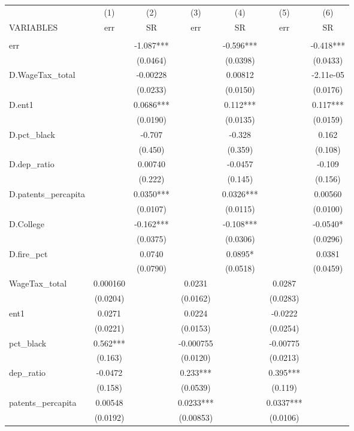 \begin{tabular}{lcccccc} \hline
 & (1) & (2) & (3) & (4) & (5) & (6) \\
VARIABLES & err & SR & err & SR & err & SR \\ \hline
 &  &  &  &  &  &  \\
err &  & -1.087*** &  & -0.596*** &  & -0.418*** \\
 &  & (0.0464) &  & (0.0398) &  & (0.0433) \\
D.WageTax\_total &  & -0.00228 &  & 0.00812 &  & -2.11e-05 \\
 &  & (0.0233) &  & (0.0150) &  & (0.0176) \\
D.ent1 &  & 0.0686*** &  & 0.112*** &  & 0.117*** \\
 &  & (0.0190) &  & (0.0135) &  & (0.0159) \\
D.pct\_black &  & -0.707 &  & -0.328 &  & 0.162 \\
 &  & (0.450) &  & (0.359) &  & (0.108) \\
D.dep\_ratio &  & 0.00740 &  & -0.0457 &  & -0.109 \\
 &  & (0.222) &  & (0.145) &  & (0.156) \\
D.patents\_percapita &  & 0.0350*** &  & 0.0326*** &  & 0.00560 \\
 &  & (0.0107) &  & (0.0115) &  & (0.0100) \\
D.College &  & -0.162*** &  & -0.108*** &  & -0.0540* \\
 &  & (0.0375) &  & (0.0306) &  & (0.0296) \\
D.fire\_pct &  & 0.0740 &  & 0.0895* &  & 0.0381 \\
 &  & (0.0790) &  & (0.0518) &  & (0.0459) \\
WageTax\_total & 0.000160 &  & 0.0231 &  & 0.0287 &  \\
 & (0.0204) &  & (0.0162) &  & (0.0283) &  \\
ent1 & 0.0271 &  & 0.0224 &  & -0.0222 &  \\
 & (0.0221) &  & (0.0153) &  & (0.0254) &  \\
pct\_black & 0.562*** &  & -0.000755 &  & -0.00775 &  \\
 & (0.163) &  & (0.0120) &  & (0.0213) &  \\
dep\_ratio & -0.0472 &  & 0.233*** &  & 0.395*** &  \\
 & (0.158) &  & (0.0539) &  & (0.119) &  \\
patents\_percapita & 0.00548 &  & 0.0233*** &  & 0.0337*** &  \\
 & (0.0192) &  & (0.00853) &  & (0.0106) &  \\

\end{tabular}
